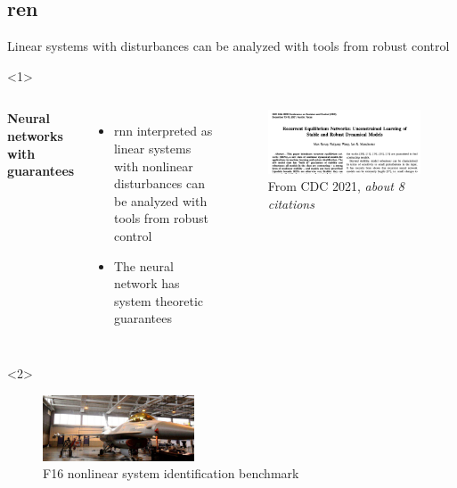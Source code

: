 \documentclass[8pt, t,
aspectratio=169,%
]{beamer}
\begin{document}
\subsection{\Acrlong{ren}}
\begin{frame}{Linear systems with disturbances can be analyzed with tools from robust control}
    \vspace{-0.5cm}
    \begin{onlyenv}<1>
        \begin{columns}
                \textbf{Neural networks with guarantees}
                \begin{itemize}
                    \item \Gls{rnn} interpreted as linear systems with nonlinear disturbances can be analyzed with tools from robust control
                    \item The neural network has system theoretic guarantees
                \end{itemize}
                \begin{figure}
                    \includegraphics[width=\textwidth]{ren.png}
                    \caption{From CDC 2021, \emph{about 8 citations}\cite{revay2021recurrent}}
                \end{figure}
        \end{columns}
    \end{onlyenv}
    \begin{onlyenv}<2>
        \begin{figure}
            \includegraphics[width=0.4\textwidth]{fig/f16.png}
            \caption{F16 nonlinear system identification benchmark \cite{noel2017f}}
        \end{figure}
        

\end{onlyenv}
\end{frame}
\end{document}
